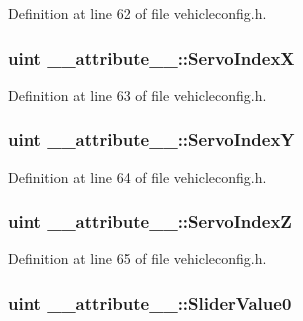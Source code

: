 \-Definition at line 62 of file vehicleconfig.\-h.

\hypertarget{group___config_plugin_ga0d592171bd6f7381c2a33dfed5f7c40d}{
\subsubsection[{\-Servo\-Index\-X}]{\setlength{\rightskip}{0pt plus 5cm}uint {\bf \-\_\-\-\_\-attribute\-\_\-\-\_\-\-::\-Servo\-Index\-X}}}\label{group___config_plugin_ga0d592171bd6f7381c2a33dfed5f7c40d}


\-Definition at line 63 of file vehicleconfig.\-h.

\hypertarget{group___config_plugin_ga517baa5d4109f802400efeb8a5897b1b}{
\subsubsection[{\-Servo\-Index\-Y}]{\setlength{\rightskip}{0pt plus 5cm}uint {\bf \-\_\-\-\_\-attribute\-\_\-\-\_\-\-::\-Servo\-Index\-Y}}}\label{group___config_plugin_ga517baa5d4109f802400efeb8a5897b1b}


\-Definition at line 64 of file vehicleconfig.\-h.

\hypertarget{group___config_plugin_ga661c3e27f6844865ea7244fa1363516e}{
\subsubsection[{\-Servo\-Index\-Z}]{\setlength{\rightskip}{0pt plus 5cm}uint {\bf \-\_\-\-\_\-attribute\-\_\-\-\_\-\-::\-Servo\-Index\-Z}}}\label{group___config_plugin_ga661c3e27f6844865ea7244fa1363516e}


\-Definition at line 65 of file vehicleconfig.\-h.

\hypertarget{group___config_plugin_ga2787c0bb4ab205071860d7a5c90cb7a6}{
\subsubsection[{\-Slider\-Value0}]{\setlength{\rightskip}{0pt plus 5cm}uint {\bf \-\_\-\-\_\-attribute\-\_\-\-\_\-\-::\-Slider\-Value0}}}\label{group___config_plugin_ga2787c0bb4ab205071860d7a5c90cb7a6}


